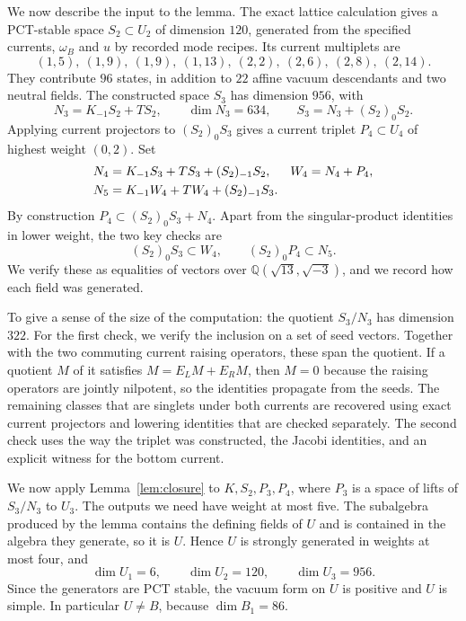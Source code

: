 \documentclass[11pt,a4paper]{article}
\newcommand{\QQ}{\mathbb Q}
\begin{document}
We now describe the input to the lemma. The exact lattice calculation
gives a PCT-stable space
$S_2\subset U_2$ of dimension $120$, generated from the specified
currents, $\omega_B$ and $u$ by recorded mode recipes. Its current
multiplets are
\[
 (1,5),\ (1,9),\ (1,9),\ (1,13),\ (2,2),\ (2,6),\ (2,8),\ (2,14).
\]
They contribute $96$ states, in addition to $22$ affine vacuum
descendants and two neutral fields. The constructed space $S_3$ has
dimension $956$, with
\begin{equation}\label{eq:S3}
 N_3=K_{-1}S_2+TS_2,\qquad \dim N_3=634,\qquad
 S_3=N_3+(S_2)_0S_2.
\end{equation}
Applying current projectors to $(S_2)_0S_3$ gives a current triplet
$P_4\subset U_4$ of highest weight $(0,2)$. Set
\begin{align}
 N_4&=K_{-1}S_3+TS_3+(S_2)_{-1}S_2,&W_4&=N_4+P_4,\notag\\
 N_5&=K_{-1}W_4+TW_4+(S_2)_{-1}S_3.&&\label{eq:normal}
\end{align}
By construction $P_4\subset(S_2)_0S_3+N_4$.
Apart from the singular-product identities in lower weight, the two key checks are
\begin{equation}\label{eq:gates}
 (S_2)_0S_3\subset W_4,\qquad (S_2)_0P_4\subset N_5.
\end{equation}
We verify these as equalities of vectors over
$\QQ(\sqrt{13},\sqrt{-3})$, and we record how each field was generated.

To give a sense of the size of the computation: the quotient
$S_3/N_3$ has dimension $322$. For the first check, we verify the
inclusion on a set of seed vectors. Together with the two
commuting current raising operators, these span the quotient. If a quotient
$M$ of it satisfies $M=E_LM+E_RM$, then $M=0$ because the raising
operators are jointly nilpotent, so the identities propagate from the
seeds. The remaining classes that are singlets under both currents are
recovered using exact current projectors and lowering identities that
are checked separately. The second check uses the way the triplet was
constructed, the Jacobi identities, and an explicit witness for the
bottom current.

We now apply Lemma~\ref{lem:closure} to $K,S_2,P_3,P_4$, where $P_3$
is a space of lifts of $S_3/N_3$ to $U_3$. The outputs we need have
weight at most five. The subalgebra produced by the lemma contains the
defining fields of $U$ and is contained in the algebra they generate,
so it is $U$. Hence $U$ is strongly generated in weights at most four,
and
\begin{equation}\label{eq:lowgrades}
 \dim U_1=6,\qquad \dim U_2=120,\qquad \dim U_3=956.
\end{equation}
Since the generators are PCT stable, the vacuum form on $U$ is positive
and $U$ is simple. In particular $U\ne B$, because $\dim B_1=86$.
\end{document}
